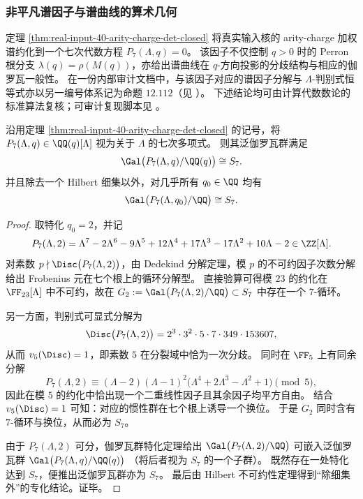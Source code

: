 
\subsubsection{非平凡谱因子与谱曲线的算术几何}\label{app:real-input-40-arity-charge-spectral-curve}
定理 \ref{thm:real-input-40-arity-charge-det-closed} 将真实输入核的 arity-charge 加权谱约化到一个七次代数方程
\(
P_7(\Lambda,q)=0
\)。
该因子不仅控制 \(q>0\) 时的 Perron 根分支 \(\lambda(q)=\rho(M(q))\)，亦给出谱曲线在 \(q\)-方向投影的分歧结构与相应的伽罗瓦一般性。
在一份内部审计文档中，与该因子对应的谱因子分解与 \(\Lambda\)-判别式恒等式亦以另一编号体系记为命题 \(12.112\)（见 \cite{Internal2026ChiTwistedZetaSeventhInterfaceProp12112}）。
下述结论均可由计算代数数论的标准算法复核；可审计复现脚本见
。

\begin{theorem}\label{thm:real-input-40-p7-generic-galois-s7}
沿用定理 \ref{thm:real-input-40-arity-charge-det-closed} 的记号，将 \(P_7(\Lambda,q)\in\QQ(q)[\Lambda]\) 视为关于 \(\Lambda\) 的七次多项式。
则其泛伽罗瓦群满足
\[
\Gal\bigl(P_7(\Lambda,q)/\QQ(q)\bigr)\cong S_7.
\]
并且除去一个 Hilbert 细集以外，对几乎所有 \(q_0\in\QQ\) 均有
\[
\Gal\bigl(P_7(\Lambda,q_0)/\QQ\bigr)\cong S_7.
\]
\end{theorem}
\begin{proof}
取特化 \(q_0=2\)，并记
\[
P_7(\Lambda,2)=\Lambda^7-2\Lambda^6-9\Lambda^5+12\Lambda^4+17\Lambda^3-17\Lambda^2+10\Lambda-2\in\ZZ[\Lambda].
\]
对素数 \(p\nmid \Disc\bigl(P_7(\Lambda,2)\bigr)\)，由 Dedekind 分解定理，模 \(p\) 的不可约因子次数分解给出 Frobenius 元在七个根上的循环分解型。
直接验算可得模 \(23\) 的约化在 \(\FF_{23}[\Lambda]\) 中不可约，故在
\(
G_2:=\Gal\bigl(P_7(\Lambda,2)/\QQ\bigr)\subset S_7
\)
中存在一个 \(7\)-循环。
\par
另一方面，判别式可显式分解为
\[
\Disc\bigl(P_7(\Lambda,2)\bigr)=2^3\cdot 3^2\cdot 5\cdot 7\cdot 349\cdot 153607,
\]
从而 \(v_5(\Disc)=1\)，即素数 \(5\) 在分裂域中恰为一次分歧。
同时在 \(\FF_5\) 上有同余分解
\[
P_7(\Lambda,2)\equiv (\Lambda-2)(\Lambda-1)^2\bigl(\Lambda^4+2\Lambda^3-\Lambda^2+1\bigr)\pmod 5,
\]
因此在模 \(5\) 的约化中恰出现一个二重线性因子且其余因子均平方自由。
结合 \(v_5(\Disc)=1\) 可知：对应的惯性群在七个根上诱导一个换位。
于是 \(G_2\) 同时含有 \(7\)-循环与换位，从而必为 \(S_7\)。
\par
由于 \(P_7(\Lambda,2)\) 可分，伽罗瓦群特化定理给出
\(
\Gal\bigl(P_7(\Lambda,2)/\QQ\bigr)
\)
可嵌入泛伽罗瓦群
\(
\Gal\bigl(P_7(\Lambda,q)/\QQ(q)\bigr)
\)
（将后者视为 \(S_7\) 的一个子群）。
既然存在一处特化达到 \(S_7\)，便推出泛伽罗瓦群亦为 \(S_7\)。
最后由 Hilbert 不可约性定理得到“除细集外”的专化结论。证毕。
\end{proof}

